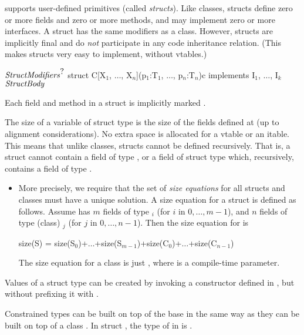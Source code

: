 \Xten{} supports user-defined primitives (called
\emph{structs}). Like classes, structs define zero or more fields and
zero or more methods, and may implement zero or more interfaces. A
struct has the same modifiers as a class. However, structs are
implicitly final and do \emph{not} participate in any code
inheritance relation. (This makes structs very easy to implement,
without vtables.)

\begin{xtenmath}
$\mbox{\emph{StructModifiers}}^{\mbox{?}}$
struct C[X$_1$, $\ldots$, X$_n$](p$_1$:T$_1$, $\ldots$, p$_n$:T$_n$){c} 
   implements I$_1$, $\ldots$, I$_k$ {
$\mbox{\emph{StructBody}}$
}
\end{xtenmath}

Each field and method in a struct is implicitly marked .  

The size of a variable of struct type  is the size of the fields
defined at  (up to alignment considerations). No extra space is
allocated for a vtable or an itable. This means that unlike classes,
structs cannot be defined recursively. That is, a struct  cannot
contain a field of type , or a field of struct type  which,
recursively, contains a field of type .

\begin{itemize}
\item More precisely, we require that the set of \emph{size equations}
  for all structs and classes must have a unique solution. A size
  equation for a struct  is defined as follows. Assume  has $m$ fields
  of type $_i$ (for $i$ in $0,\ldots,m-1$), and $n$ fields of type (class) $_j$
  (for $j$ in $0,\ldots,n-1$). Then the size equation for  is 
\begin{xtenmath}
size(S) = size(S$_0$)+$\ldots$+size(S$_{m-1}$)+size(C$_0$)+$\ldots$+size(C$_{n-1}$) 
\end{xtenmath}
The size
equation for a class  is just , where
 is a compile-time parameter.
\end{itemize}

Values of a struct  type can be created by invoking a constructor
defined in , but without prefixing it with .

Constrained types can be built on top of the base  in the same way as
they can be built on top of a class . In struct ,
the type of  in  is .

